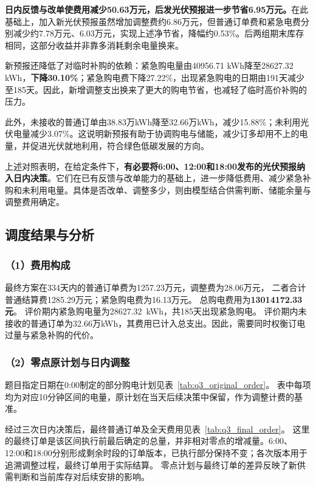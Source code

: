 \textbf{日内反馈与改单使费用减少50.63万元，后发光伏预报进一步节省6.95万元。}在此基础上，加入新光伏预报虽然增加调整费约6.86万元，但普通订单费和紧急电费分别减少约7.78万元、6.03万元，实现上述净节省，降幅约0.53\%。后两组期末库存相同，这部分收益并非靠多消耗剩余电量换来。

新预报还降低了对临时补购的依赖：紧急购电量由40956.71 kWh降至28627.32 kWh，\textbf{下降30.10\%}；紧急购电费下降27.22\%，出现紧急购电的日期由191天减少至185天。因此，新增调整支出换来了更大的购电节省，也减轻了临时高价补购的压力。

此外，未接收的普通订单由38.83万kWh降至32.66万kWh，减少15.88\%；未利用光伏电量减少3.07\%。这说明新预报有助于协调购电与储能，减少订多却用不上的电量，并促进光伏就地利用，符合绿色低碳发展的方向。

上述对照表明，在给定条件下，\textbf{有必要将6:00、12:00和18:00发布的光伏预报纳入日内决策}。它们在已有反馈与改单能力的基础上，进一步降低费用、减少紧急补购和未利用电量。具体是否改单、调整多少，则由模型结合供需判断、储能余量与调整费用确定。

\FloatBarrier
\subsection{调度结果与分析}\label{sec:q3_dispatch_results}

\subsubsection*{（1）费用构成}

最终方案在334天内的普通订单费为1257.23万元，调整费为28.06万元，
二者合计普通结算费1285.29万元；紧急购电费为16.13万元。
总购电费用为\textbf{13014172.33元}。
评价期内紧急购电量为28627.32~kWh，共185天出现紧急购电。
评价期内未接收的普通订单为32.66万kWh，其费用已计入总支出。因此，需要同时权衡订电过量与紧急补购的代价。

\subsubsection*{（2）零点原计划与日内调整}

题目指定日期在0:00制定的部分购电计划见表~\ref{tab:q3_original_order}。
表中每项均为对应10分钟区间的电量，原计划在当天后续决策中保留，作为调整计费的基准。



经过三次日内决策后，最终普通订单及全天费用见表~\ref{tab:q3_final_order}。
这里的最终订单是该区间执行前最后确定的总量，并非相对零点的增减量。6:00、12:00和18:00分别形成剩余时段的订单版本，已执行部分保持不变；各次版本用于追溯调整过程，最终订单用于实际结算。
零点计划与最终订单的差异反映了新供需判断和当前库存对后续安排的影响。

